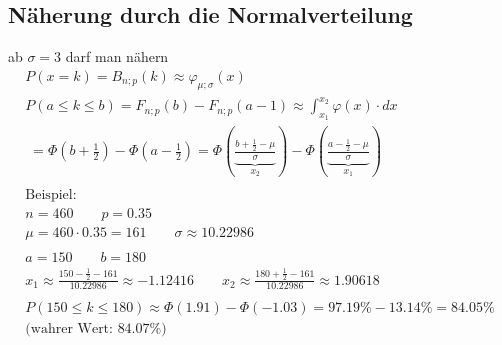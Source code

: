 \subsection{Näherung durch die Normalverteilung}
ab $\sigma = 3$ darf man nähern
\begin{gather*}
  P(x = k) = B_{n; p}(k) \approx \varphi_{\mu; \sigma}(x) \\
  P(a \leq k \leq b) = F_{n; p}(b) - F_{n; p}(a - 1) \approx \int_{x_1}^{x_2} \varphi(x) \cdot dx \\
  \;= \Phi(b + \frac{1}{2}) - \Phi(a - \frac{1}{2}) = \Phi(\underbrace{\frac{b + \frac{1}{2} - \mu}{\sigma}}_{x_2}) - \Phi(\underbrace{\frac{a - \frac{1}{2} - \mu}{\sigma}}_{x_1}) \\\\
  \text{Beispiel:} \\
  n = 460 \qquad p = 0.35 \\
  \mu = 460 \cdot 0.35 = 161 \qquad \sigma \approx 10.22986 \\\\
  a = 150 \qquad b = 180 \\
  x_1 \approx \frac{150 - \frac{1}{2} - 161}{10.22986} \approx -1.12416 \qquad x_2 \approx \frac{180 + \frac{1}{2} - 161}{10.22986} \approx 1.90618 \\\\
  P(150 \leq k \leq 180) \approx \Phi(1.91) - \Phi(-1.03) = 97.19\% - 13.14\% = 84.05\% \\
  \text{(wahrer Wert: $84.07\%$)}
\end{gather*}
